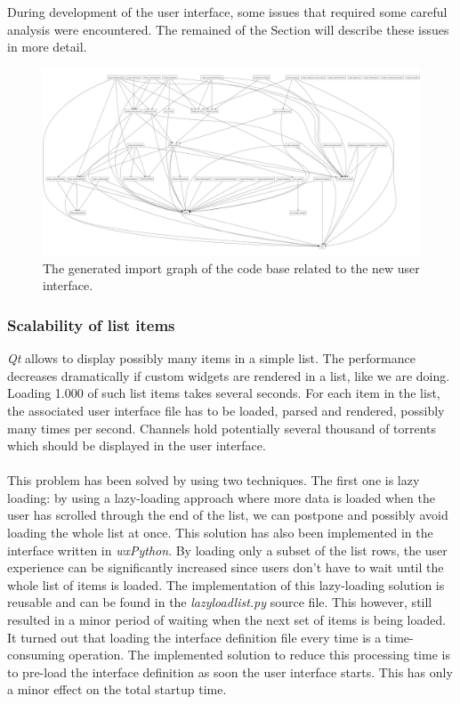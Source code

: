During development of the user interface, some issues that required some careful analysis were encountered. The remained of the Section will describe these issues in more detail.

\begin{figure}[h!]
	\centering
	\includegraphics[width=1.0\columnwidth]{images/improving_qa/importgraph_new_gui}
	\caption{The generated import graph of the code base related to the new user interface.}
	\label{fig:importgraph-qt-gui}
\end{figure}

\subsubsection{\textbf{Scalability of list items}}
\emph{Qt} allows to display possibly many items in a simple list. The performance decreases dramatically if custom widgets are rendered in a list, like we are doing. Loading 1.000 of such list items takes several seconds. For each item in the list, the associated user interface file has to be loaded, parsed and rendered, possibly many times per second. Channels hold potentially several thousand of torrents which should be displayed in the user interface.\\\\
This problem has been solved by using two techniques. The first one is lazy loading: by using a lazy-loading approach where more data is loaded when the user has scrolled through the end of the list, we can postpone and possibly avoid loading the whole list at once. This solution has also been implemented in the interface written in \emph{wxPython}. By loading only a subset of the list rows, the user experience can be significantly increased since users don't have to wait until the whole list of items is loaded. The implementation of this lazy-loading solution is reusable and can be found in the \emph{lazyloadlist.py} source file. This however, still resulted in a minor period of waiting when the next set of items is being loaded. It turned out that loading the interface definition file every time is a time-consuming operation. The implemented solution to reduce this processing time is to pre-load the interface definition as soon the user interface starts. This has only a minor effect on the total startup time.

